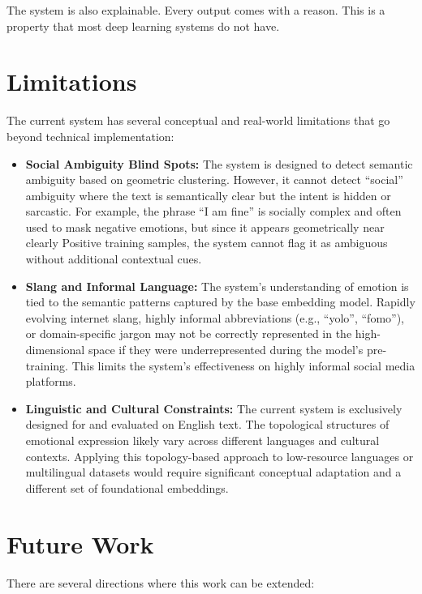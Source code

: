 The system is also explainable. Every output comes with a reason. This is a property that most
deep learning systems do not have.

\section{Limitations}

The current system has several conceptual and real-world limitations that go beyond technical implementation:

\begin{itemize}
    \item \textbf{Social Ambiguity Blind Spots:} The system is designed to detect semantic
    ambiguity based on geometric clustering. However, it cannot detect ``social'' ambiguity
    where the text is semantically clear but the intent is hidden or sarcastic. For example, the
    phrase ``I am fine'' is socially complex and often used to mask negative emotions, but since
    it appears geometrically near clearly Positive training samples, the system cannot flag it as
    ambiguous without additional contextual cues.

    \item \textbf{Slang and Informal Language:} The system's understanding of emotion is tied to
    the semantic patterns captured by the base embedding model. Rapidly evolving internet
    slang, highly informal abbreviations (e.g., ``yolo'', ``fomo''), or domain-specific jargon
    may not be correctly represented in the high-dimensional space if they were underrepresented
    during the model's pre-training. This limits the system's effectiveness on highly informal
    social media platforms.

    \item \textbf{Linguistic and Cultural Constraints:} The current system is exclusively
    designed for and evaluated on English text. The topological structures of emotional
    expression likely vary across different languages and cultural contexts. Applying this
    topology-based approach to low-resource languages or multilingual datasets would require
    significant conceptual adaptation and a different set of foundational embeddings.
\end{itemize}

\section{Future Work}

There are several directions where this work can be extended:

